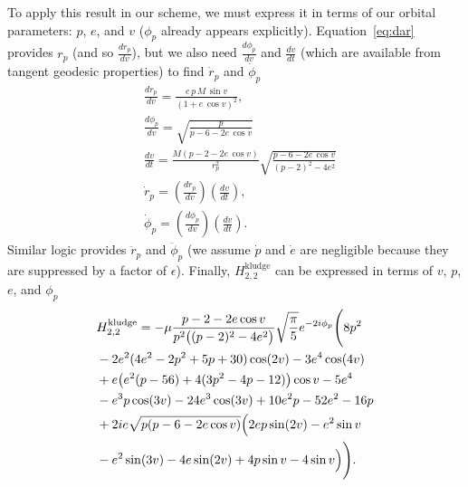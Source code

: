 \documentclass[aps,prd,twocolumn,showpacs,notitlepage,eqsecnum,
superscriptaddress,nofootinbib]{revtex4-1}
\begin{document}
To apply this result in our scheme, we must express it in terms of our orbital parameters: $p$, $e$, and $v$ ($\phi_p$ already appears explicitly). Equation~\eqref{eq:dar} provides $r_p$ (and so $\frac{dr_p}{dv}$), but we also need $\frac{d\phi_p}{dv}$ and $\frac{dv}{dt}$ (which are available from tangent geodesic properties) to find $\dot{r}_p$ and $\dot{\phi}_p$
\begin{align}
    &\frac{dr_p}{dv} = \frac{e\,p\,M\,\sin{v}}{(1+e\,\cos{v})^2} ,
    \\
    &\frac{d\phi_p}{dv} = \sqrt{\frac{p}{p-6-2 e\,\cos{v} }}
    \\
    &\frac{dv}{dt} = \frac{M(p-2-2e\,\cos{v})}{r_p^2} \sqrt{\frac{p-6-2 e\,\cos{v} }{(p-2)^2-4e^2}}
    \\
    &\dot{r}_p = \left(\frac{dr_p}{dv}\right) \left({\frac{dv}{dt}}\right) , \\
    &\dot{\phi}_p = \left(\frac{d\phi_p}{dv}\right) \left({\frac{dv}{dt}}\right) .
\end{align}
Similar logic provides $\ddot{r}_p$ and $\ddot{\phi}_p$ (we assume $\dot{p}$ and $\dot{e}$ are negligible because they are suppressed by a factor of $\epsilon$).
Finally, $H_{2,2}^\text{kludge}$ can be expressed in terms of $v$, $p$, $e$, and $\phi_p$
\begin{align}
\label{eq:isolateKludge}
&H_{2,2}^\text{kludge}=-\mu \frac{p-2-2 e \cos{v}}{p^2 \big((p-2)^2-4 e^2\big)}\sqrt{\frac{\pi }{5}} e^{-2i\phi_p} \Bigg( 8 p^2  \notag
\\&  -2 e^2 (4 e^2-2 p^2+5 p+30) \cos (2 v) -3 e^4 \cos (4 v) \notag
\\&+e\big(e^2 (p-56)+4 (3 p^2-4 p-12)\big) \cos{v} -5 e^4 \notag
\\&-e^3 p \cos (3 v) -24 e^3 \cos (3 v) +10 e^2 p -52 e^2 -16 p \notag
\\&+2ie \sqrt{p(p-6-2 e \cos{v})} \Big( 2 e p \sin (2 v) - e^2 \sin{v}\notag
\\&-e^2 \sin (3 v)-4 e \sin (2 v)+4 p \sin{v}-4 \sin{v} \Big) \Bigg).
\end{align}


\end{document}
